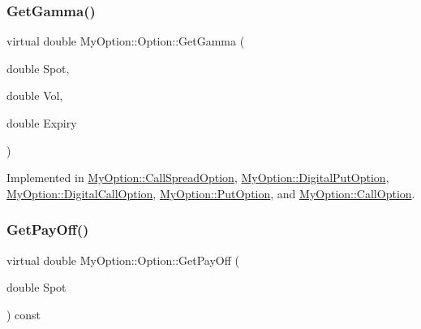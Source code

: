 \hypertarget{classMyOption_1_1Option_a4416faa432b5004e449394056c7f1363}{}\label{classMyOption_1_1Option_a4416faa432b5004e449394056c7f1363} 
\subsubsection{\texorpdfstring{Get\+Gamma()}{GetGamma()}}
{\footnotesize\ttfamily virtual double My\+Option\+::\+Option\+::\+Get\+Gamma (\begin{DoxyParamCaption}\item[{double}]{Spot,  }\item[{double}]{Vol,  }\item[{double}]{Expiry }\end{DoxyParamCaption})\hspace{0.3cm}{\ttfamily [pure virtual]}}



Implemented in \hyperlink{classMyOption_1_1CallSpreadOption_ac8dd9fdb03603013350d611e6931a314}{My\+Option\+::\+Call\+Spread\+Option}, \hyperlink{classMyOption_1_1DigitalPutOption_a4eeb4d0c53f0075ee80e67270f4bd6a5}{My\+Option\+::\+Digital\+Put\+Option}, \hyperlink{classMyOption_1_1DigitalCallOption_aa4fcb3de1cbeb6eea6a41149ae884402}{My\+Option\+::\+Digital\+Call\+Option}, \hyperlink{classMyOption_1_1PutOption_aaca54c52498c8809c84d4c6800827526}{My\+Option\+::\+Put\+Option}, and \hyperlink{classMyOption_1_1CallOption_a135259127b922e4ce4db8243c3c52a54}{My\+Option\+::\+Call\+Option}.

\hypertarget{classMyOption_1_1Option_a4b6b84dc485153ffadfb32afa9bb52f3}{}\label{classMyOption_1_1Option_a4b6b84dc485153ffadfb32afa9bb52f3} 
\subsubsection{\texorpdfstring{Get\+Pay\+Off()}{GetPayOff()}}
{\footnotesize\ttfamily virtual double My\+Option\+::\+Option\+::\+Get\+Pay\+Off (\begin{DoxyParamCaption}\item[{double}]{Spot }\end{DoxyParamCaption}) const\hspace{0.3cm}{\ttfamily [pure virtual]}}



